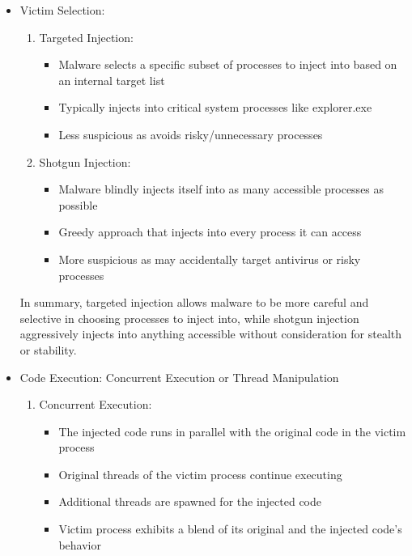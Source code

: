 \documentclass{article}
\begin{document}
\begin{itemize}
\item Victim Selection:
  \begin{enumerate}
    \item Targeted Injection:
      \begin{itemize}
      \item Malware selects a specific subset of processes to inject into based on an internal target list
      \item Typically injects into critical system processes like explorer.exe
      \item Less suspicious as avoids risky/unnecessary processes
      \end{itemize}
    \item Shotgun Injection:
      \begin{itemize}
        \item Malware blindly injects itself into as many accessible processes as possible
        \item Greedy approach that injects into every process it can access
        \item More suspicious as may accidentally target antivirus or risky processes
     \end{itemize}
 \end{enumerate}

  In summary, targeted injection allows malware to be more careful and selective in choosing processes to inject into, while shotgun injection aggressively injects into anything accessible without consideration for stealth or stability.

  \item Code Execution: Concurrent Execution or Thread Manipulation

    \begin{enumerate}
      \item Concurrent Execution:
        \begin{itemize}
          \item The injected code runs in parallel with the original code in the victim process
          \item Original threads of the victim process continue executing
          \item Additional threads are spawned for the injected code
          \item Victim process exhibits a blend of its original and the injected code's behavior
        \end{itemize}


\end{enumerate}
\end{itemize}
\end{document}
